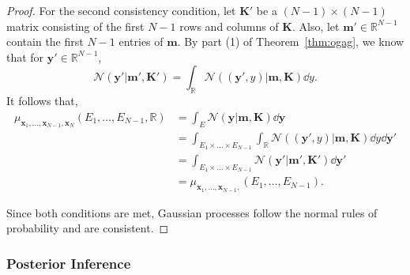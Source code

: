 \begin{proof}
    For the second consistency condition, let $\mathbf{K}'$ be a $(N - 1) \times (N - 1)$ matrix consisting of the first $N - 1$ rows and columns of $\mathbf{K}$.
    Also, let $\mathbf{m}' \in \mathbb{R}^{N - 1}$ contain the first $N - 1$ entries of $\mathbf{m}$.
    By part (1) of Theorem~\ref{thm:ogag}, we know that for $\mathbf{y}' \in \mathbb{R}^{N - 1}$,
    \begin{equation*}
        \mathcal{N}(\mathbf{y}' | \mathbf{m}', \mathbf{K}')
        = \int_{\mathbb{R}} \mathcal{N}((\mathbf{y}', y) | \mathbf{m}, \mathbf{K}) \dd y.
    \end{equation*}
    It follows that,
    \begin{align*}
        \mu_{\mathbf{x}_1, \dots, \mathbf{x}_{N - 1}, \mathbf{x}_N}(E_1, \dots, E_{N - 1}, \mathbb{R})
        & = \int_{E} \mathcal{N}( \mathbf{y} | \mathbf{m}, \mathbf{K}) \dd \mathbf{y} \\
        & = \int_{E_1 \times \dots \times E_{N - 1}}
        \int_{\mathbb{R}}
        \mathcal{N}( (\mathbf{y}', y) | \mathbf{m}, \mathbf{K})
        \dd y
        \dd \mathbf{y}' \\
        & = \int_{E_1 \times \dots \times E_{N - 1}}
        \mathcal{N}( \mathbf{y}' | \mathbf{m}', \mathbf{K}')
        \dd \mathbf{y}' \\
        & = \mu_{\mathbf{x}_1, \dots, \mathbf{x}_{N - 1}, }(E_1, \dots, E_{N - 1}).
    \end{align*}

    Since both conditions are met, Gaussian processes follow the normal rules of probability and are consistent.
\end{proof}

\subsubsection{Posterior Inference}\label{sssec:post-inf}

